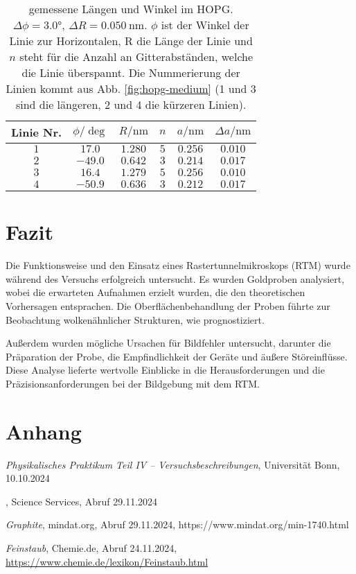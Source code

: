 \documentclass{article}
\newcommand{\defc}{black}
\newcommand{\colorT}[2][blue]{\color{#1}{#2}\color{\defc}}
\newcommand{\todo}[1]{\colorT[red]{\textbf{(#1)}}}
\begin{document}
\begin{table}[h]
    \centering
    \begin{tabular}{c||c|c|c|c|c}
        Linie Nr. & $\phi/\si{\deg}$ & $R/\si{\nm}$ & $n$ & $a/\si{\nm}$ & $\Delta a/\si{\nm}$ \\
        \hline
        $1$ & $17.0 $   & $1.280$ & $5$ & $0.256$ & $0.010$ \\
        $2$ & $-49.0$	& $0.642$ & $3$ & $0.214$ & $0.017$ \\
        $3$ & $16.4	$   & $1.279$ & $5$ & $0.256$ & $0.010$ \\
        $4$ & $-50.9$	& $0.636$ & $3$ & $0.212$ & $0.017$
    \end{tabular}
    \caption{gemessene Längen und Winkel im HOPG. $\Delta\phi=\ang{3.0}$, $\Delta R = \SI{0.050}{\nm}$. $\phi$ ist der Winkel der Linie zur Horizontalen, R die Länge der Linie und $n$ steht für die Anzahl an Gitterabständen, welche die Linie überspannt. Die Nummerierung der Linien kommt aus Abb. \ref{fig:hopg-medium} (1 und 3 sind die längeren, 2 und 4 die kürzeren Linien).}
    \label{tab:hopg-daten-1}
\end{table}



\clearpage
\section{Fazit}
Die Funktionsweise und den Einsatz eines Rastertunnelmikroskops (RTM) wurde während des Versuchs erfolgreich untersucht. Es wurden Goldproben analysiert, wobei die erwarteten Aufnahmen erzielt wurden, die den theoretischen Vorhersagen entsprachen. Die Oberflächenbehandlung der Proben führte zur Beobachtung wolkenähnlicher Strukturen, wie prognostiziert. 

Außerdem wurden mögliche Ursachen für Bildfehler untersucht, darunter die Präparation der Probe, die Empfindlichkeit der Geräte und äußere Störeinflüsse. Diese Analyse lieferte wertvolle Einblicke in die Herausforderungen und die Präzisionsanforderungen bei der Bildgebung mit dem RTM.







\clearpage
\section{Anhang}


\clearpage
\begin{thebibliography}{9}

\textit{Physikalisches Praktikum Teil IV -- Versuchsbeschreibungen}, Universität Bonn, 10.10.2024


\todo{Was Sie über TEM-Grids wissen sollten}, Science Services, Abruf 29.11.2024

\textit{Graphite}, mindat.org, Abruf 29.11.2024, https://www.mindat.org/min-1740.html

\textit{Feinstaub}, Chemie.de, Abruf 24.11.2024, \url{https://www.chemie.de/lexikon/Feinstaub.html}


\end{thebibliography}
\end{document}
